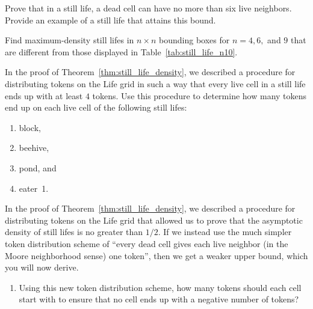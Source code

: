 \begin{multicols}{2}
	
	\begin{problemstar}\label{exer:still_lifes_6_neigh} 
		Prove that in a still life, a dead cell can have no more than six live neighbors. Provide an example of a still life that attains this bound.
	\end{problemstar}
	
	
	\mfilbreak
	
	
	\begin{problem}\label{exer:densest_still_lifes} 
		Find maximum-density still lifes in $n \times n$ bounding boxes for $n = 4, 6,$ and $9$ that are different from those displayed in Table~\ref{tab:still_life_n10}.
	\end{problem}
	
	
	\mfilbreak
	
	
	\begin{problem}\label{exer:still_life_tokens} 
		In the proof of Theorem~\ref{thm:still_life_density}, we described a procedure for distributing tokens on the Life grid in such a way that every live cell in a still life ends up with at least $4$ tokens. Use this procedure to determine how many tokens end up on each live cell of the following still lifes:\smallskip
		
		\begin{enumerate}[label=\bf\color{ocre}(\alph*)]
			\item block,
			
			\item beehive,
			
			\item pond, and
			
			\item eater~1.
		\end{enumerate}
	\end{problem}
	
	
	\mfilbreak
	
	
	\begin{problemstar}\label{exer:sl_density_611} 
		In the proof of Theorem~\ref{thm:still_life_density}, we described a procedure for distributing tokens on the Life grid that allowed us to prove that the asymptotic density of still lifes is no greater than $1/2$. If we instead use the much simpler token distribution scheme of ``every dead cell gives each live neighbor (in the Moore neighborhood sense) one token'', then we get a weaker upper bound, which you will now derive.\smallskip
		
		\begin{enumerate}[label=\bf\color{ocre}(\alph*)]
			\item Using this new token distribution scheme, how many tokens should each cell start with to ensure that no cell ends up with a negative number of tokens?
			

\end{enumerate}
\end{problemstar}
\end{multicols}

